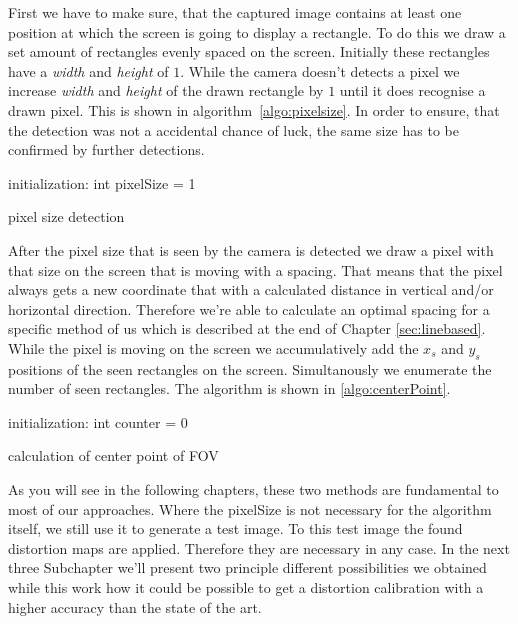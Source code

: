 \documentclass[journal,final,a4paper,twoside]{PS}
\begin{document}
 First we have to make sure, that the captured image contains at least one position at which the screen is going to display a rectangle. To do this we draw a set amount of rectangles evenly spaced on the screen. Initially these rectangles have a \emph{width} and \emph{height} of $1$. While the camera doesn't detects a pixel we increase \emph{width} and \emph{height} of the drawn rectangle by $1$ until it does recognise a drawn pixel. This is shown in algorithm~\ref{algo:pixelsize}. In order to ensure, that the detection was not a accidental chance of luck, the same size has to be confirmed by further detections. 
\begin{algorithm}[h]
 initialization: int pixelSize = 1\;
 \caption{pixel size detection}
 \label{algo:pixelsize}
\end{algorithm} 
 
 After the pixel size that is seen by the camera is detected we draw a pixel with that size on the screen that is moving with a spacing. That means that the pixel always gets a new coordinate that with a calculated distance in vertical and/or horizontal  direction. Therefore we're able to calculate an optimal spacing for a specific method of us which is described at the end of Chapter \ref{sec:linebased}. While the pixel is moving on the screen we accumulatively add the $x_s$ and $y_s$ positions of the seen rectangles on the screen. Simultanously we enumerate the number of seen rectangles. The algorithm is shown in \ref{algo:centerPoint}.
 
\begin{algorithm}[h]
 initialization: int counter = 0\;
 \caption{calculation of center point of FOV}
 \label{algo:centerPoint}
\end{algorithm} 

As you will see in the following chapters, these two methods are fundamental to most of our approaches. Where the pixelSize is not necessary for the algorithm itself, we still use it to generate a test image. To this test image the found distortion maps are applied. Therefore they are necessary in any case. In the next three Subchapter we'll present two principle different possibilities we obtained while this work how it could be possible to get a distortion calibration with a higher accuracy than the state of the art. 
\end{document}
